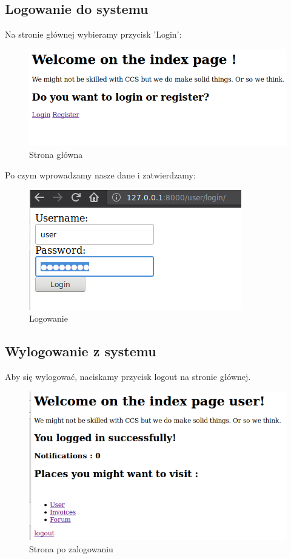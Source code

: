 \documentclass[12pt]{article}
\begin{document}
\subsection{Logowanie do systemu}
Na stronie głównej wybieramy przycisk 'Login':
\begin{figure}[H]
	\centering
	\includegraphics[scale=0.5]{img/1.png}
	\caption{Strona główna}
\end{figure}
Po czym wprowadzamy nasze dane i zatwierdzamy:
\begin{figure}[H]
	\centering
	\includegraphics[scale=0.5]{img/4.png}
	\caption{Logowanie}
\end{figure}

\subsection{Wylogowanie z systemu}
Aby się wylogować, naciskamy przycisk logout na stronie głównej.
\begin{figure}[H]
	\centering
	\includegraphics[scale=0.5]{img/3.png}
	\caption{Strona po zalogowaniu}
\end{figure}
\end{document}
